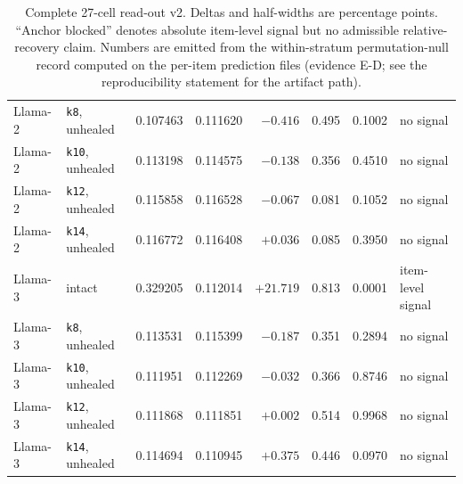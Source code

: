 \begin{table}[t]
\begin{tabular}{llrrrrrl}
Llama-2 & \texttt{k8}, unhealed & 0.107463 & 0.111620 & $-0.416$ & 0.495 & 0.1002 & no signal \\
Llama-2 & \texttt{k10}, unhealed & 0.113198 & 0.114575 & $-0.138$ & 0.356 & 0.4510 & no signal \\
Llama-2 & \texttt{k12}, unhealed & 0.115858 & 0.116528 & $-0.067$ & 0.081 & 0.1052 & no signal \\
Llama-2 & \texttt{k14}, unhealed & 0.116772 & 0.116408 & $+0.036$ & 0.085 & 0.3950 & no signal \\
Llama-3 & intact & 0.329205 & 0.112014 & $+21.719$ & 0.813 & 0.0001 & item-level signal \\
Llama-3 & \texttt{k8}, unhealed & 0.113531 & 0.115399 & $-0.187$ & 0.351 & 0.2894 & no signal \\
Llama-3 & \texttt{k10}, unhealed & 0.111951 & 0.112269 & $-0.032$ & 0.366 & 0.8746 & no signal \\
Llama-3 & \texttt{k12}, unhealed & 0.111868 & 0.111851 & $+0.002$ & 0.514 & 0.9968 & no signal \\
Llama-3 & \texttt{k14}, unhealed & 0.114694 & 0.110945 & $+0.375$ & 0.446 & 0.0970 & no signal \\
\bottomrule
\end{tabular}
\caption{Complete 27-cell read-out v2. Deltas and half-widths are percentage points. ``Anchor blocked'' denotes absolute item-level signal but no admissible relative-recovery claim. Numbers are emitted from the within-stratum permutation-null record computed on the per-item prediction files (evidence \textsf{E-D}; see the reproducibility statement for the artifact path).}
\label{tab:v2-full}
\end{table}
